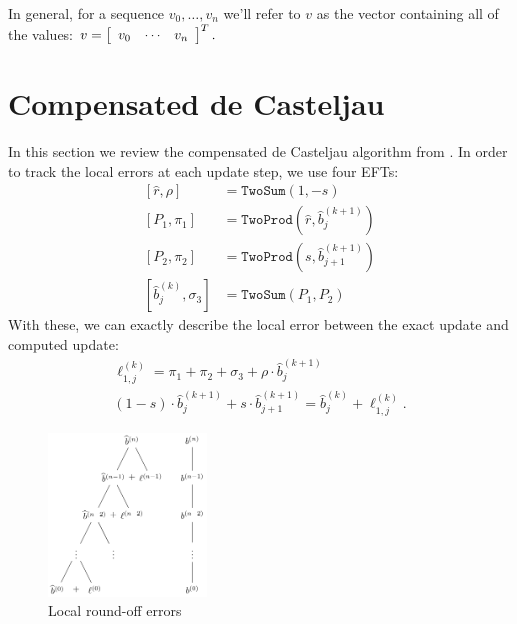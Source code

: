 \documentclass[3p, authoryear, square]{elsarticle}
\theoremstyle{definition}
\begin{document}
In general, for a sequence \(v_0, \ldots, v_n\) we'll refer to \(v\)
as the vector containing all of the values:
\(v = \left[\begin{array}{c c c} v_0 & \cdots &
    v_n\end{array}\right]^T.\)

\section{Compensated de Casteljau}\label{sec:compensated-2}

In this section we review the compensated de Casteljau algorithm
from \cite{Jiang2010}. In order to track the local errors at
each update step, we use four EFTs:
\begin{align}
\left[\widehat{r}, \rho\right] &= \mathtt{TwoSum}(1, -s) \\
\left[P_1, \pi_1\right] &= \mathtt{TwoProd}\left(
    \widehat{r}, \widehat{b}_j^{(k + 1)}\right) \\
\left[P_2, \pi_2\right] &= \mathtt{TwoProd}\left(
    s, \widehat{b}_{j + 1}^{(k + 1)}\right) \\
\left[\widehat{b}_j^{(k)}, \sigma_3\right] &= \mathtt{TwoSum}(P_1, P_2)
\end{align}
With these, we can exactly describe the local error between the exact
update and computed update:
\begin{gather}
\ell_{1, j}^{(k)} = \pi_1 + \pi_2 + \sigma_3 + \rho \cdot
  \widehat{b}_j^{(k + 1)} \label{ell-j} \\
(1 - s) \cdot \widehat{b}_j^{(k + 1)} +
  s \cdot \widehat{b}_{j + 1}^{(k + 1)} =
\widehat{b}_j^{(k)} + \ell_{1, j}^{(k)}.
\end{gather}

\begin{figure}
  \includegraphics[width=0.375\textwidth]{tikz_local_err.pdf}
  \centering
  \captionsetup{width=.75\linewidth}
  \caption{Local round-off errors}
  \label{fig:loc-err-accumulate}
\end{figure}
\end{document}
